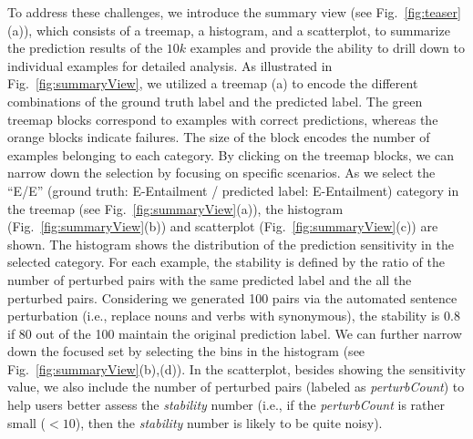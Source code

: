 To address these challenges, we introduce the summary view (see Fig.~\ref{fig:teaser}(a)), which consists of a treemap, a histogram, and a scatterplot, to summarize the prediction results of the $10k$ examples and provide the ability to drill down to individual examples for detailed analysis.
As illustrated in Fig.~\ref{fig:summaryView}, we utilized a treemap (a) to encode the different combinations of the ground truth label and the predicted label. The green treemap blocks correspond to examples with correct predictions, whereas the orange blocks indicate failures. The size of the block encodes the number of examples belonging to each category.
%
By clicking on the treemap blocks, we can narrow down the selection by focusing on specific scenarios.
%
As we select the ``E/E'' (ground truth: E-Entailment / predicted label: E-Entailment) category in the treemap (see Fig.~\ref{fig:summaryView}(a)), the histogram (Fig.~\ref{fig:summaryView}(b)) and scatterplot  (Fig.~\ref{fig:summaryView}(c)) are shown. The histogram shows the distribution of the prediction sensitivity in the selected category. For each example, the stability is defined by the ratio of the number of perturbed pairs with the same predicted label and the all the perturbed pairs. Considering we generated 100 pairs via the automated sentence perturbation (i.e., replace nouns and verbs with synonymous), the stability is 0.8 if 80 out of the 100 maintain the original prediction label. 
%
We can further narrow down the focused set by selecting the bins in the histogram (see Fig.~\ref{fig:summaryView}(b),(d)).
%
In the scatterplot, besides showing the sensitivity value, we also include the number of perturbed pairs (labeled as \emph{perturbCount}) to help users better assess the \emph{stability} number (i.e., if the \emph{perturbCount} is rather small ($<10$), then the \emph{stability} number is likely to be quite noisy). %




